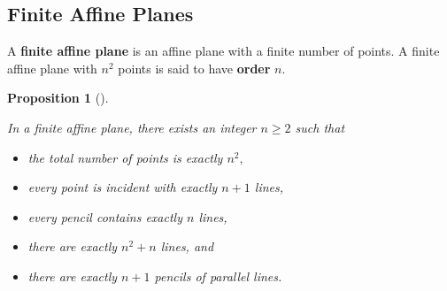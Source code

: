 \documentclass[
  twoside,
  12pt,
  letterpaper,
  fleqn]{article}
\providecommand{\tightlist}{%
  \setlength{\itemsep}{0pt}\setlength{\parskip}{0pt}}\usepackage{longtable,booktabs,array}
\theoremstyle{definition}
\theoremstyle{definition}
\theoremstyle{plain}
\newtheorem{proposition}{Proposition}[section]
\theoremstyle{plain}
\theoremstyle{remark}
\begin{document}
\hypertarget{finite-affine-planes}{%
\subsection{Finite Affine Planes}\label{finite-affine-planes}}

A \textbf{finite affine plane} is an affine plane with a finite number
of points. A finite affine plane with \(n^2\) points is said to have
\textbf{order} \(n.\)

\begin{proposition}[]\protect\hypertarget{prp-five}{}\label{prp-five}

In a finite affine plane, there exists an integer \(n\geq 2\) such that

\begin{itemize}
\tightlist
\item
  the total number of points is exactly \(n^2,\)
\item
  every point is incident with exactly \(n+1\) lines,
\item
  every pencil contains exactly \(n\) lines,
\item
  there are exactly \(n^2+n\) lines, and
\item
  there are exactly \(n+1\) pencils of parallel lines.
\end{itemize}

\end{proposition}
\end{document}

